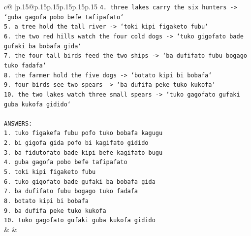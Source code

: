 \documentclass{article}
\begin{document}
{\begin{supertabular}{c@{$\;$}|p{.15\linewidth}@{}p{.15\linewidth}p{.15\linewidth}p{.15\linewidth}p{.15\linewidth}p{.15\linewidth}}
{{{\texttt{4. three lakes carry the six hunters {-}> `guba gagofa pobo befe tafipafato`} \\
\texttt{5. a tree hold the tall river {-}> `toki kipi figaketo fubu`} \\
\texttt{6. the two red hills watch the four cold dogs {-}> `tuko gigofato bade gufaki ba bobafa gida`} \\
\texttt{7. the four tall birds feed the two ships {-}> `ba dufifato fubu bogago tuko fadafa`} \\
\texttt{8. the farmer hold the five dogs {-}> `botato kipi bi bobafa`} \\
\texttt{9. four birds see two spears {-}> `ba dufifa peke tuko kukofa`} \\
\texttt{10. the two lakes watch three small spears {-}> `tuko gagofato gufaki guba kukofa gidido`} \\
\\ 
\texttt{ANSWERS:} \\
\texttt{1. tuko figakefa fubu pofo tuko bobafa kagugu} \\
\texttt{2. bi gigofa gida pofo bi kagifato gidido} \\
\texttt{3. ba fidutofato bade kipi befe kagifato bugu} \\
\texttt{4. guba gagofa pobo befe tafipafato} \\
\texttt{5. toki kipi figaketo fubu} \\
\texttt{6. tuko gigofato bade gufaki ba bobafa gida} \\
\texttt{7. ba dufifato fubu bogago tuko fadafa} \\
\texttt{8. botato kipi bi bobafa} \\
\texttt{9. ba dufifa peke tuko kukofa} \\
\texttt{10. tuko gagofato gufaki guba kukofa gidido} \\
            }
        }
    }
    & & \\ \\


\end{supertabular}}
\end{document}

